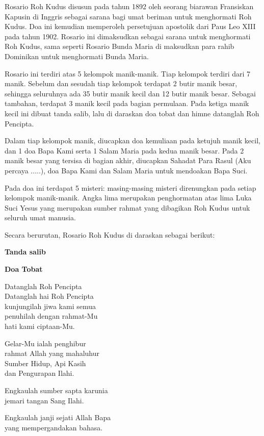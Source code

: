 \documentclass[a5paper,titlepage,11pt]{book}
\begin{document}
\scriptsize
Rosario Roh Kudus disusun pada tahun 1892 oleh seorang biarawan Fransiskan Kapusin di Inggris sebagai sarana bagi umat beriman untuk menghormati Roh Kudus. Doa ini kemudian memperoleh persetujuan apostolik dari Paus Leo XIII pada tahun 1902. Rosario ini dimaksudkan sebagai sarana untuk menghormati Roh Kudus, sama seperti Rosario Bunda Maria di maksudkan para rahib Dominikan untuk menghormati Bunda Maria.

Rosario ini terdiri atas 5 kelompok manik-manik. Tiap kelompok terdiri dari 7 manik. Sebelum dan sesudah tiap kelompok terdapat 2 butir manik besar, sehingga seluruhnya ada 35 butir manik kecil dan 12 butir manik besar. Sebagai tambahan, terdapat 3 manik kecil pada bagian permulaan. Pada ketiga manik kecil ini dibuat tanda salib, lalu di daraskan doa tobat dan himne datanglah Roh Pencipta.

Dalam tiap kelompok manik, diucapkan doa kemuliaan pada ketujuh manik kecil, dan 1 doa Bapa Kami serta 1 Salam Maria pada kedua manik besar. Pada 2 manik besar yang tersisa di bagian akhir, diucapkan Sahadat Para Rasul (Aku percaya .....), doa Bapa Kami dan Salam Maria untuk mendoakan Bapa Suci.

Pada doa ini terdapat 5 misteri: masing-masing misteri direnungkan pada setiap kelompok manik-manik. Angka lima merupakan penghormatan atas lima Luka Suci Yesus yang merupakan sumber rahmat yang dibagikan Roh Kudus untuk seluruh umat manusia.

\normalsize
Secara berurutan, Rosario Roh Kudus di daraskan sebagai berikut:

{\bf Tanda salib}

{\bf Doa Tobat}

Datanglah Roh Pencipta\\
Datanglah hai Roh Pencipta\\
kunjungilah jiwa kami semua\\
penuhilah dengan rahmat-Mu\\
hati kami ciptaan-Mu.

Gelar-Mu ialah penghibur\\
rahmat Allah yang mahaluhur\\
Sumber Hidup, Api Kasih\\
dan Pengurapan Ilahi.

Engkaulah sumber sapta karunia\\
jemari tangan Sang Ilahi.

Engkaulah janji sejati Allah Bapa\\
yang mempergandakan bahasa.
\end{document}
